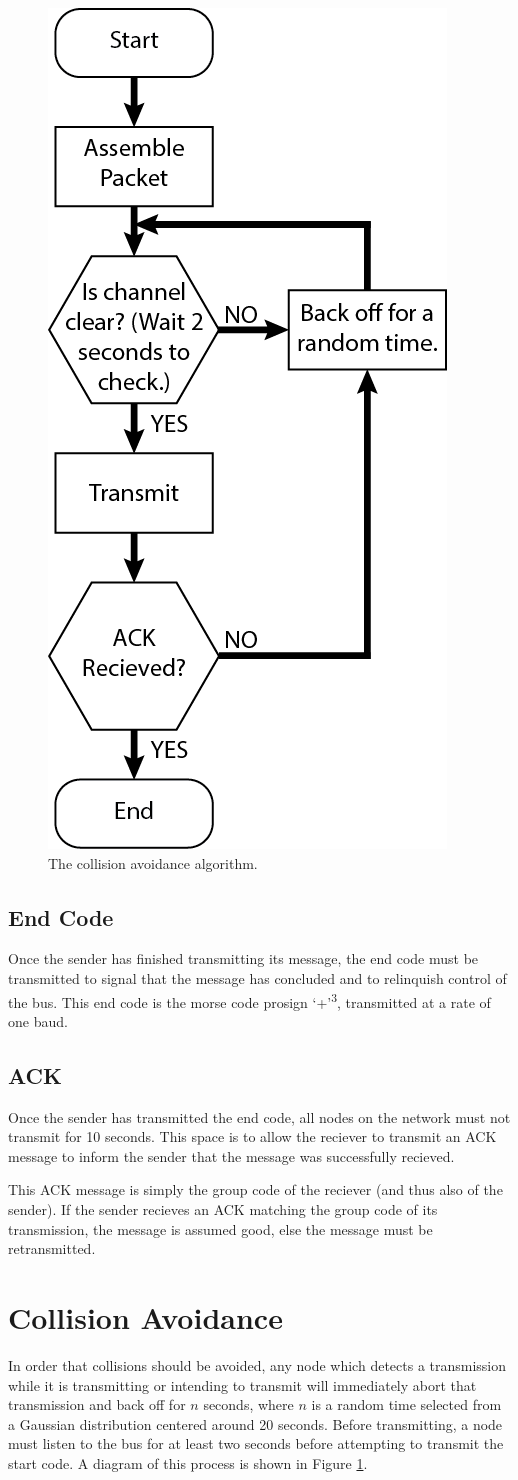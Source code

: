 \documentclass[11pt]{article}
\begin{document}
\begin{figure}
\vspace{-40pt}
\centering
\includegraphics[width=.3\textwidth]{CSMA_Flow.png}
\caption{The collision avoidance algorithm.}
\label{fig:CSMA}
\end{figure}


\subsection{End Code}

Once the sender has finished transmitting its message, the end code must be transmitted to signal that the message has concluded and to relinquish control of the bus. This end code is the morse code prosign `+'\textsuperscript{3}, transmitted at a rate of one baud.

\subsection{ACK}


Once the sender has transmitted the end code, all nodes on the network must not transmit for 10 seconds. This space is to allow the reciever to transmit an ACK message to inform the sender that the message was successfully recieved.

This ACK message is simply the group code of the reciever (and thus also of the sender). If the sender recieves an ACK matching the group code of its transmission, the message is assumed good, else the message must be retransmitted.

\section{Collision Avoidance}
\label{sec:collision_avoidance}

In order that collisions should be avoided, any node which detects a transmission while it is transmitting or intending to transmit will immediately abort that transmission and back off for $n$ seconds, where $n$ is a random time selected from a Gaussian distribution centered around 20 seconds. Before transmitting, a node must listen to the bus for at least two seconds before attempting to transmit the start code. A diagram of this process is shown in Figure \ref{fig:CSMA}.
\end{document}

